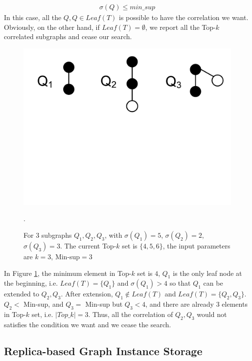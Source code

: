 \begin{align*} \sigma(Q)\le min\_sup\end{align*}
In this case, all the $Q,Q\in Leaf(T)$ is possible to have the correlation we want. Obviously, on the other hand, if $Leaf(T)=\emptyset$, we report all the {\sf Top-$k$} correlated subgraphs and cease our search.
\begin{figure}[t!]
	\centering
	\includegraphics[scale=0.32]{images/ceasing_condition}
	\vspace{-2mm}
	\caption{\scriptsize For 3 subgraphs $Q_1,Q_2,Q_3$, with $\sigma(Q_1)=5$, $\sigma(Q_2)=2$, $\sigma(Q_3)=3$. The current {\sf Top-$k$} set is $\{4,5,6\}$, the input parameters are $k=3$, {\sf Min-sup}$=3$}.
	\label{fig:ceasing_condition}
	\vspace{-6mm}
\end{figure}
\begin{exple}
	In Figure \ref{fig:ceasing_condition}, the minimum element in {\sf Top-$k$} set is $4$, $Q_1$ is the only leaf node at the beginning, i.e. $Leaf(T)=\{Q_1\}$ and $\sigma(Q_1)>4$ so that $Q_1$ can be extended to $Q_2,Q_3$. After extension, $Q_1\notin Leaf(T)$ and $Leaf(T)=\{Q_2,Q_3\}$. $Q_2<$ {\sf Min-sup}, and $Q_3=$ {\sf Min-sup} but $Q_3<4$, and there are already $3$ elements in {\sf Top-$k$} set, i.e. $|Top\_k|=3$. Thus, all the correlation of $Q_2,Q_3$ would not satisfies the condition we want and we cease the search.
\end{exple}



\subsection{Replica-based Graph Instance Storage}
\label{subsec:replica-storage}

